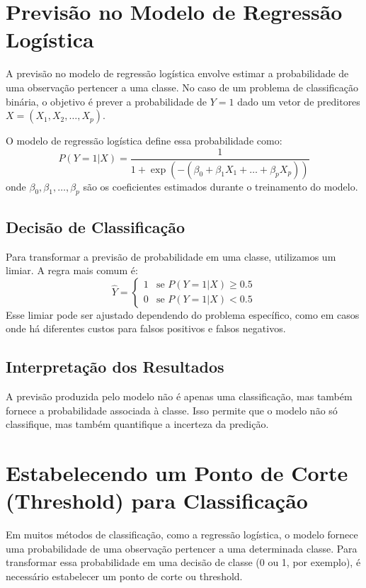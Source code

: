 \documentclass{sciposter}
\begin{document}
\begin{multicols}{3}
\section{Previsão no Modelo de Regressão Logística}

A previsão no modelo de regressão logística envolve estimar a probabilidade de uma observação pertencer a uma classe. No caso de um problema de classificação binária, o objetivo é prever a probabilidade de \(Y = 1\) dado um vetor de preditores \(X = (X_1, X_2, \dots, X_p)\).

O modelo de regressão logística define essa probabilidade como:
\[
P(Y = 1 | X) = \frac{1}{1 + \exp(-(\beta_0 + \beta_1 X_1 + \dots + \beta_p X_p))}
\]
onde \(\beta_0, \beta_1, \dots, \beta_p\) são os coeficientes estimados durante o treinamento do modelo.

\subsection{Decisão de Classificação}
Para transformar a previsão de probabilidade em uma classe, utilizamos um limiar. A regra mais comum é:
\[
\hat{Y} = 
\begin{cases} 
1 & \text{se } P(Y = 1 | X) \geq 0.5 \\
0 & \text{se } P(Y = 1 | X) < 0.5
\end{cases}
\]
Esse limiar pode ser ajustado dependendo do problema específico, como em casos onde há diferentes custos para falsos positivos e falsos negativos.

\subsection{Interpretação dos Resultados}
A previsão produzida pelo modelo não é apenas uma classificação, mas também fornece a probabilidade associada à classe. Isso permite que o modelo não só classifique, mas também quantifique a incerteza da predição.

\section{Estabelecendo um Ponto de Corte (Threshold) para Classificação}

Em muitos métodos de classificação, como a regressão logística, o modelo fornece uma probabilidade de uma observação pertencer a uma determinada classe. Para transformar essa probabilidade em uma decisão de classe (0 ou 1, por exemplo), é necessário estabelecer um ponto de corte ou threshold.


\end{multicols}
\end{document}
